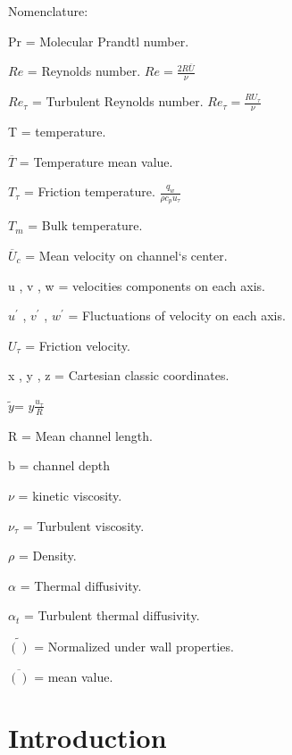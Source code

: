 \documentclass[10pt]{article} %
\begin{document}
\pagebreak

\begin{LARGE}
	Nomenclature: 
\end{LARGE} 


	Pr = Molecular Prandtl number.
	
	
	
	
	$Re$ = Reynolds number. $Re = \frac{2R \overline{U}}{\nu}$
	
	
	$Re_\tau$ = Turbulent Reynolds number. $Re_\tau = \frac{R U_\tau}{\nu}$
	
	
	
	T = temperature.
	
	
	${\overline{T}}$ = Temperature mean value.
	
	
	
	$T_\tau$ = Friction temperature. $\frac{q_w}{\rho c_p u_\tau}$ 
	
	
	
	
	$T_m$ = Bulk temperature. 
	
	
	
	
	$\overline{U}_c$ = Mean velocity on channel`s center.
	
	
	
	u , v , w = velocities components on each axis.
	
	
	$u^\prime $ , $ v^\prime $ , $ w^\prime $ = Fluctuations of velocity on each axis.
	
	
	$U_\tau$ = Friction velocity.
	
	
	x , y , z = Cartesian classic coordinates.
	
	
	$\tilde{y} $= $ y \frac{u_\tau}{R} $
	
	
	R = Mean channel length.
	
	
	
	b = channel depth
	
	
	
	$\nu$ = kinetic viscosity.
	
	
	$\nu_\tau$ = Turbulent viscosity.
	
	
	$\rho$ = Density.
	
	
	$\alpha$ = Thermal diffusivity.
	
	
	$\alpha_t$ = Turbulent thermal diffusivity. 
	
	
	$\tilde{()}$ = Normalized under wall properties.
	
	$\overline{()}$ = mean value.  



\tableofcontents

\section{Introduction}
\end{document}
